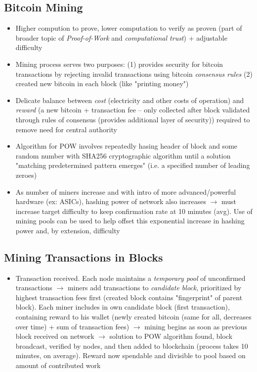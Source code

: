 \documentclass[english, 11pt]{article}
\begin{document}
\subsection{Bitcoin Mining}
\begin{itemize}
    \item Higher compution to prove, lower computation to verify as proven (part of broader topic of \textit{Proof-of-Work} and \textit{computational trust}) + adjustable difficulty
    \item Mining process serves two purposes: (1) provides security for bitcoin transactions by rejecting invalid transactions using bitcoin \textit{consensus rules} (2) created new bitcoin in each block (like "printing money")
    \item Delicate balance between \textit{cost} (electricity and other costs of operation) and \textit{reward} (a new bitcoin + transaction fee -- only collected after block validated through rules of consensus (provides additional layer of security)) required to remove need for central authority
    \item Algorithm for POW involves repeatedly hasing header of block and some random number with SHA256 cryptographic algorithm until a solution "matching predetermined pattern emerges" (i.e. a specified number of leading zeroes)
    \item As number of miners increase and with intro of more advanced/powerful hardware (ex: ASICs), hashing power of network also increases $\rightarrow$ must increase target difficulty to keep confirmation rate at 10 minutes (avg). Use of mining pools can be used to help offset this exponential increase in hashing power and, by extension, difficulty
\end{itemize}

\subsection{Mining Transactions in Blocks}
\begin{itemize}
    \item Transaction received. Each node maintains a \textit{temporary pool} of unconfirmed transactions $\rightarrow$ miners add transactions to \textit{candidate block}, prioritized by highest transaction fees first (created block contains "fingerprint" of parent block). Each miner includes  in own candidate block (first transaction), containing reward to his wallet (newly created bitcoin (same for all, decreases over time) + sum of transaction fees) $\rightarrow$ mining begins as soon as previous block received on network $\rightarrow$ solution to POW algorithm found, block broadcast, verified by nodes, and then added to blockchain (process takes 10 minutes, on average). Reward now spendable and divisible to pool based on amount of contributed work
\end{itemize}
\end{document}
